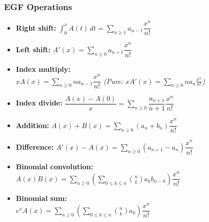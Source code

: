 \subsubsection*{EGF Operations}
\begin{itemize}
    \item \textbf{Right shift:} $\int_0^x A(t) \, dt = \sum_{n \ge 1} a_{n - 1} \dfrac{x^n}{n!}$
    \item \textbf{Left shift:} $A'(x) = \sum_{n \ge 0} a_{n + 1} \dfrac{x^n}{n!}$
    \item \textbf{Index multiply:} \\ $x A(x) = \sum_{n \ge 0} n a_{n - 1} \dfrac{x^n}{n!}$ \quad \textit{(Pure: $x A'(x) = \sum_{n \ge 0} n a_n \frac{x^n}{n!}$)}
    \item \textbf{Index divide:} $\dfrac{A(x) - A(0)}{x} = \sum_{n \ge 0} \dfrac{a_{n + 1}}{n + 1} \dfrac{x^n}{n!}$
    \item \textbf{Addition:} $A(x) + B(x) = \sum_{n \ge 0} (a_n + b_n) \dfrac{x^n}{n!}$
    \item \textbf{Difference:} $A'(x) - A(x) = \sum_{n \ge 0} (a_{n + 1} - a_n) \dfrac{x^n}{n!}$
    \item \textbf{Binomial convolution:}\\  $A(x) B(x) = \sum_{n \ge 0} \left( \sum_{0 \le k \le n} \binom{n}{k} a_k b_{n - k} \right) \dfrac{x^n}{n!}$
    \item \textbf{Binomial sum:}\\ $e^x A(x) = \sum_{n \ge 0} \left( \sum_{0 \le k \le n} \binom{n}{k} a_k \right) \dfrac{x^n}{n!}$
\end{itemize}